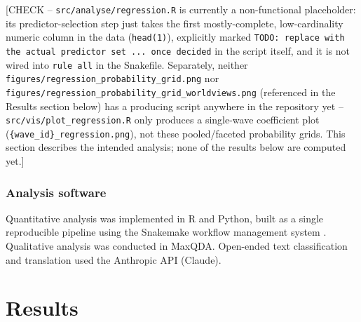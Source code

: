\documentclass[10pt,letterpaper]{article}
\begin{document}

[CHECK -- \texttt{src/analyse/regression.R} is currently a non-functional placeholder: its predictor-selection step just takes the first mostly-complete, low-cardinality numeric column in the data (\texttt{head(1)}), explicitly marked \texttt{TODO: replace with the actual predictor set ... once decided} in the script itself, and it is not wired into \texttt{rule all} in the Snakefile. Separately, neither \texttt{figures/regression\_probability\_grid.png} nor \texttt{figures/regression\_probability\_grid\_worldviews.png} (referenced in the Results section below) has a producing script anywhere in the repository yet -- \texttt{src/vis/plot\_regression.R} only produces a single-wave coefficient plot (\texttt{\{wave\_id\}\_regression.png}), not these pooled/faceted probability grids. This section describes the intended analysis; none of the results below are computed yet.]

\subsubsection*{Analysis software}
Quantitative analysis was implemented in R and Python, built as a single reproducible pipeline using the Snakemake workflow management system \autocite{molder2025}.
Qualitative analysis was conducted in MaxQDA.
Open-ended text classification and translation used the Anthropic API (Claude).



\section*{Results}
\end{document}

